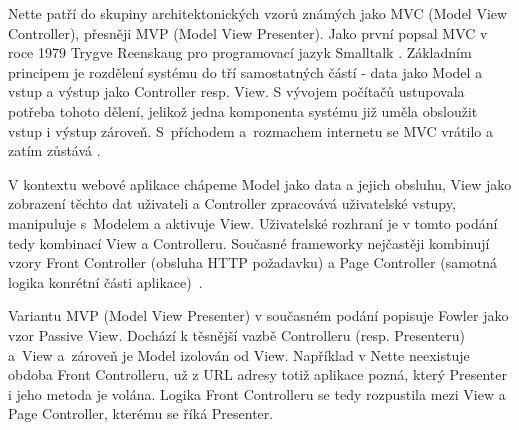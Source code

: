 Nette patří do skupiny architektonických vzorů známých jako MVC (Model View Controller), přesněji MVP (Model View Presenter). Jako první popsal MVC v roce 1979 Trygve Reenskaug pro programovací jazyk Smalltalk \cite{FowlerMVC}. Základním principem je rozdělení systému do tří samostatných částí - data jako Model a vstup a výstup jako Controller resp. View. S vývojem počítačů ustupovala potřeba tohoto dělení, jelikož jedna komponenta systému již uměla obsloužit vstup i výstup zároveň. S~příchodem a~rozmachem internetu se MVC vrátilo a zatím zůstává \cite{zdrojakMVC}.

V kontextu webové aplikace chápeme Model jako data a jejich obsluhu, View jako zobrazení těchto dat uživateli a Controller zpracovává uživatelské vstupy, manipuluje s~Modelem a aktivuje View. Uživatelské rozhraní je v tomto podání tedy kombinací View a Controlleru. Současné frameworky nejčastěji kombinují vzory Front Controller (obsluha HTTP požadavku) a Page Controller (samotná logika konrétní části aplikace)~\cite{FowlerMVC}.

Variantu MVP (Model View Presenter) v současném podání popisuje Fowler \cite{FowlerPassiveView} jako vzor Passive View. Dochází k těsnější vazbě Controlleru (resp. Presenteru) a~View a~zároveň je Model izolován od View. Například v Nette neexistuje obdoba Front Controlleru, už z URL adresy totiž aplikace pozná, který Presenter i jeho metoda je volána. Logika Front Controlleru se tedy rozpustila mezi View a Page Controller, kterému se říká Presenter.